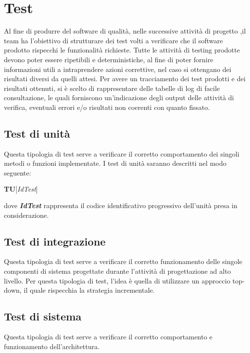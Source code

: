 \newpage
\section{Test}
Al fine di produrre del software di qualità, nelle successive attività di progetto ,il team ha l'obiettivo di strutturare dei test volti a verificare che il software prodotto rispecchi le funzionalità richieste.
Tutte le attività di testing prodotte devono poter essere ripetibili e deterministiche, al fine di poter fornire informazioni utili a intraprendere azioni correttive, nel caso si ottengano dei risultati diversi da quelli attesi.
Per avere un tracciamento dei test prodotti e dei risultati ottenuti, si è scelto di rappresentare delle tabelle di log di facile consultazione, le quali forniscono un'indicazione degli output delle attività di verifica, eventuali errori e/o risultati non coerenti con quanto fissato.

	\subsection{Test di unità}
	Questa tipologia di test serve a verificare il corretto comportamento dei singoli metodi o funzioni implementate.
	I test di unità saranno descritti nel modo seguente:
	\begin{center}
		\textbf{TU}[\textit{IdTest}]
	\end{center}
	\begin{center}
		dove \textbf{\textit{IdTest}} rappresenta il codice identificativo progressivo dell'unità presa in considerazione.
	\end{center}
	
	\subsection{Test di integrazione}
	Questa tipologia di test serve a verificare il corretto funzionamento delle singole componenti di sistema progettate durante l'attività di progettazione ad alto livello.
	Per questa tipologia di test, l'idea è quella di utilizzare un approccio top-down, il quale rispecchia la strategia incrementale.
	
	\subsection{Test di sistema}
	Questa tipologia di test serve a verificare il corretto comportamento e funzionamento dell’architettura.
	
